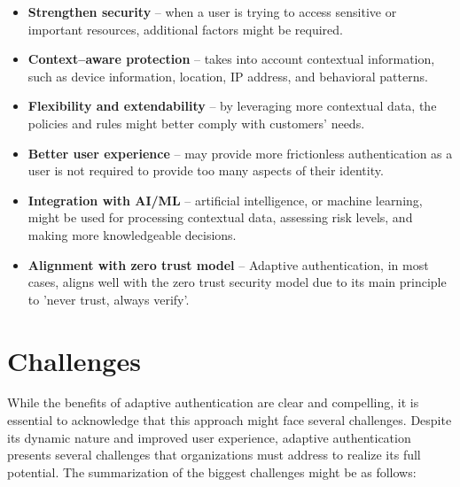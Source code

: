 \begin{itemize}
    \item \textbf{Strengthen security} -- when a user is trying to access sensitive or important resources, additional factors might be required.
    \item \textbf{Context--aware protection} -- takes into account contextual information, such as device information, location, IP address, and behavioral patterns.
    \item \textbf{Flexibility and extendability} -- by leveraging more contextual data, the policies and rules might better comply with customers' needs.
    \item \textbf{Better user experience} -- may provide more frictionless authentication as a user is not required to provide too many aspects of their identity.
    \item \textbf{Integration with AI/ML} -- artificial intelligence, or machine learning, might be used for processing contextual data, assessing risk levels, and making more knowledgeable decisions.
    \item \textbf{Alignment with zero trust model} -- Adaptive authentication, in most cases, aligns well with the zero trust security model due to its main principle to 'never trust, always verify'. \cite{intro-incognia}
\end{itemize}

\section{Challenges}
While the benefits of adaptive authentication are clear and compelling, it is essential to acknowledge that this approach might face several challenges.
Despite its dynamic nature and improved user experience, adaptive authentication presents several challenges that organizations must address to realize its full potential.
\newline
\newline
The summarization of the biggest challenges might be as follows:

